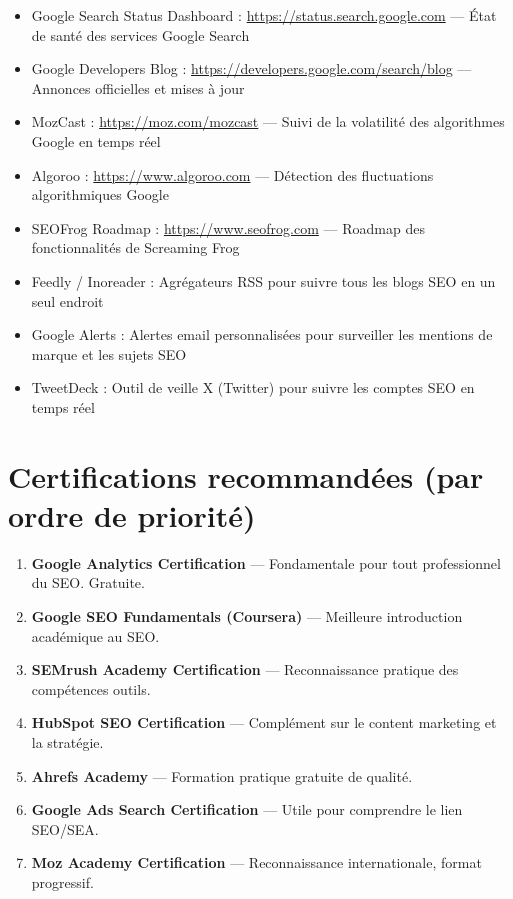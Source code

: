 \documentclass[12pt,a4paper,twoside]{report}
\begin{document}
\begin{itemize}
    \item Google Search Status Dashboard : \url{https://status.search.google.com} — État de santé des services Google Search
    \item Google Developers Blog : \url{https://developers.google.com/search/blog} — Annonces officielles et mises à jour
    \item MozCast : \url{https://moz.com/mozcast} — Suivi de la volatilité des algorithmes Google en temps réel
    \item Algoroo : \url{https://www.algoroo.com} — Détection des fluctuations algorithmiques Google
    \item SEOFrog Roadmap : \url{https://www.seofrog.com} — Roadmap des fonctionnalités de Screaming Frog
    \item Feedly / Inoreader : Agrégateurs RSS pour suivre tous les blogs SEO en un seul endroit
    \item Google Alerts : Alertes email personnalisées pour surveiller les mentions de marque et les sujets SEO
    \item TweetDeck : Outil de veille X (Twitter) pour suivre les comptes SEO en temps réel
\end{itemize}

\section*{Certifications recommandées (par ordre de priorité)}

\begin{enumerate}
    \item \textbf{Google Analytics Certification} — Fondamentale pour tout professionnel du SEO. Gratuite.
    \item \textbf{Google SEO Fundamentals (Coursera)} — Meilleure introduction académique au SEO.
    \item \textbf{SEMrush Academy Certification} — Reconnaissance pratique des compétences outils.
    \item \textbf{HubSpot SEO Certification} — Complément sur le content marketing et la stratégie.
    \item \textbf{Ahrefs Academy} — Formation pratique gratuite de qualité.
    \item \textbf{Google Ads Search Certification} — Utile pour comprendre le lien SEO/SEA.
    \item \textbf{Moz Academy Certification} — Reconnaissance internationale, format progressif.
\end{enumerate}
\end{document}
